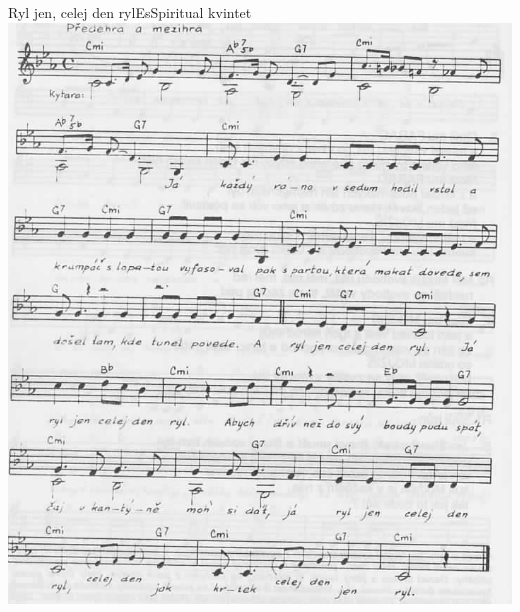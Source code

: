 \setcounter{page}{76}
\begin{song}{Ryl jen, celej den ryl}{Es}{Spiritual kvintet}
\includegraphics[width=\textwidth]{noty/a_ryl-jen-celej-den-ryl} \end{song} \pagebreak
